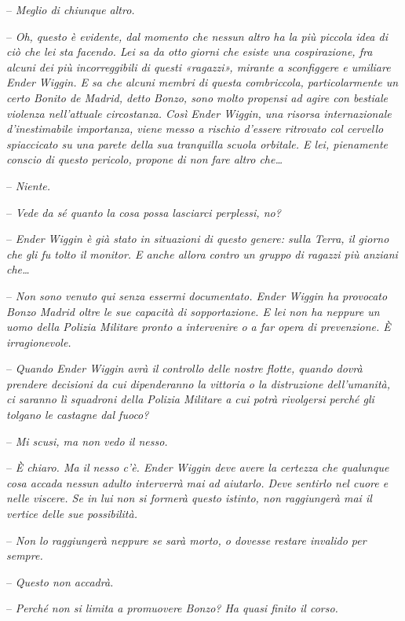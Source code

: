 {-- \emph{Meglio di chiunque altro.}}

{-- \emph{Oh, questo è evidente, dal momento che nessun altro ha la più
		piccola idea di ciò che lei sta facendo. Lei sa da otto giorni che
		esiste una cospirazione, fra alcuni dei più incorreggibili di questi
		«ragazzi», mirante a sconfiggere e umiliare Ender Wiggin. E sa che
		alcuni membri di questa combriccola, particolarmente un certo Bonito de
		Madrid, detto Bonzo, sono molto propensi ad agire con bestiale violenza
		nell'attuale circostanza. Così Ender Wiggin, una risorsa internazionale
		d'inestimabile importanza, viene messo a rischio d'essere ritrovato col
		cervello spiaccicato su una parete della sua tranquilla scuola orbitale.
		E lei, pienamente conscio di questo pericolo, propone di non fare altro
		che\ldots{}}}

{-- \emph{Niente.}}

{-- \emph{Vede da sé quanto la cosa possa lasciarci perplessi, no?}}

{-- \emph{Ender Wiggin è già stato in situazioni di questo genere: sulla
		Terra, il giorno che gli fu tolto il monitor. E anche allora contro un
		gruppo di ragazzi più anziani che\ldots{}}}

{-- \emph{Non sono venuto qui senza essermi documentato. Ender Wiggin ha
		provocato Bonzo Madrid oltre le sue capacità di sopportazione. E lei non
		ha neppure un uomo della Polizia Militare pronto a intervenire o a far
		opera di prevenzione. È irragionevole.}}

{-- \emph{Quando Ender Wiggin avrà il controllo delle nostre flotte,
		quando dovrà prendere decisioni da cui dipenderanno la vittoria o la
		distruzione dell'umanità, ci saranno lì squadroni della Polizia Militare
		a cui potrà rivolgersi perché gli tolgano le castagne dal fuoco?}}

{-- \emph{Mi scusi, ma non vedo il nesso.}}

{-- \emph{È chiaro. Ma il nesso c'è. Ender Wiggin deve avere la certezza
		che qualunque cosa accada nessun adulto interverrà mai ad aiutarlo. Deve
		sentirlo nel cuore e nelle viscere. Se in lui non si formerà questo
		istinto, non raggiungerà mai il vertice delle sue possibilità.}}

{-- \emph{Non lo raggiungerà neppure se sarà morto, o dovesse restare
		invalido per sempre.}}

{-- \emph{Questo non accadrà.}}

{-- \emph{Perché non si limita a promuovere Bonzo? Ha quasi finito il
		corso.}}

